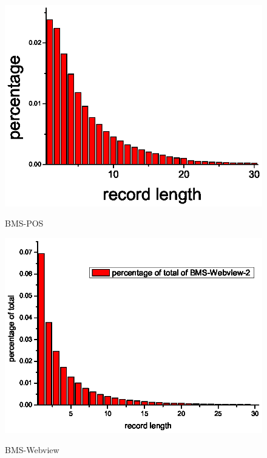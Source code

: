\documentclass{article}
\begin{document}
\begin{figure}[htb]
  \centering
  \includegraphics[scale=.8
  ]{BMS-POS.eps}\\
  \caption{BMS-POS}\label{fig:graph}
\end{figure}

\begin{figure}[htb]
   \centering
  \includegraphics[scale=.8]{BMS-WEBVIEW.eps}\\
  \caption{BMS-Webview}\label{fig:graph}
\end{figure}
\end{document}
